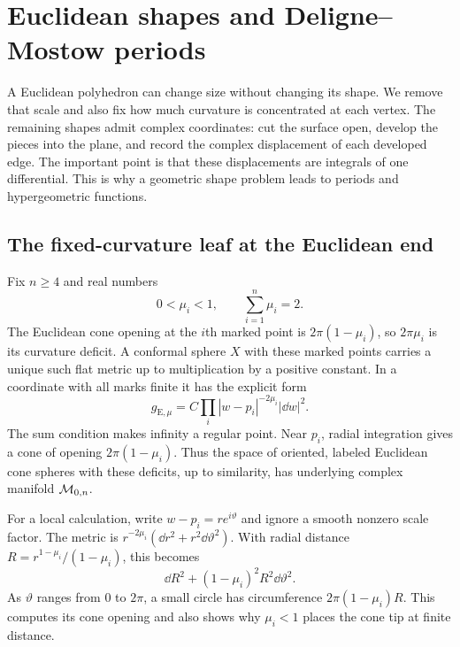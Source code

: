 \section{Euclidean shapes and Deligne--Mostow periods}
\label{sec:thurstonDM}

A Euclidean polyhedron can change size without changing its shape.
We remove that scale and also fix how much curvature is concentrated
at each vertex. The remaining shapes admit complex coordinates:
cut the surface open, develop the pieces into the plane, and record
the complex displacement of each developed edge. The important
point is that these displacements are integrals of one differential.
This is why a geometric shape problem leads to periods and
hypergeometric functions.

\subsection{The fixed-curvature leaf at the Euclidean end}

Fix $n\ge4$ and real numbers
\begin{equation}
 0<\mu_i<1,\qquad \sum_{i=1}^n\mu_i=2.
 \label{eq:flatweights}
\end{equation}
The Euclidean cone opening at the $i$th marked point is
$2\pi(1-\mu_i)$, so $2\pi\mu_i$ is its curvature deficit. A conformal
sphere $X$ with these marked points carries a unique such flat metric up
to multiplication by a positive constant. In a coordinate with all marks
finite it has the explicit form
\begin{equation}
 g_{\mathrm E,\mu}=C\prod_i|w-p_i|^{-2\mu_i}|\dd w|^2.
 \label{eq:flatconemetric}
\end{equation}
The sum condition makes infinity a regular point. Near $p_i$, radial
integration gives a cone of opening $2\pi(1-\mu_i)$. Thus the space of
oriented, labeled Euclidean cone spheres with these deficits, up to
similarity, has underlying complex manifold $\mathcal M_{0,n}$.

For a local calculation, write $w-p_i=re^{i\vartheta}$ and ignore
a smooth nonzero scale factor. The metric is
$r^{-2\mu_i}(\dd r^2+r^2\dd\vartheta^2)$.
With radial distance $R=r^{1-\mu_i}/(1-\mu_i)$, this becomes
\[
 \dd R^2+(1-\mu_i)^2R^2\dd\vartheta^2.
\]
As $\vartheta$ ranges from $0$ to $2\pi$, a small circle has
circumference $2\pi(1-\mu_i)R$. This computes its cone opening
and also shows why $\mu_i<1$ places the cone tip at finite distance.

